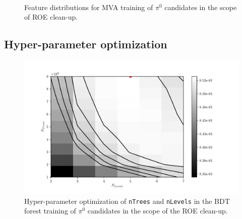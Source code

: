 \begin{figure}[H]
\\
\caption{Feature distributions for MVA training of $\pi^0$ candidates in the scope of ROE clean-up.}
\end{figure}

\subsection*{Hyper-parameter optimization}

\begin{figure}[H]
\centering
\captionsetup{width=0.8\linewidth}
\includegraphics[width=\linewidth]{fig/addendums/pi0_hpo}
\caption{Hyper-parameter optimization of \texttt{nTrees} and \texttt{nLevels} in the BDT forest training of $\pi^0$ candidates in the scope of the ROE clean-up.}
\end{figure}

